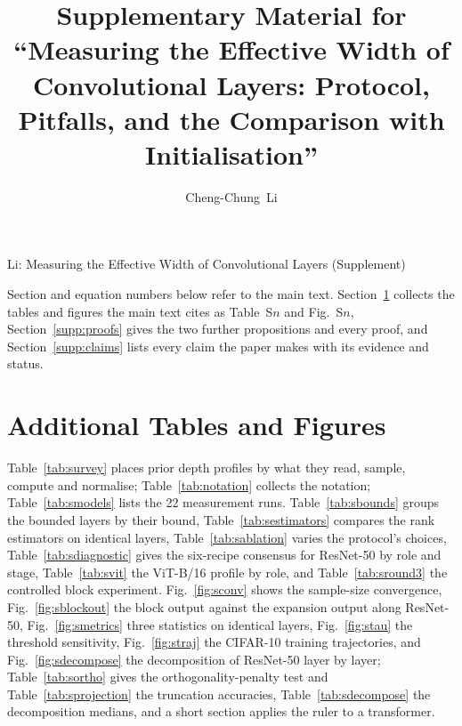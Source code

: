 \documentclass[10pt,journal,compsoc]{IEEEtran}
\begin{document}
\title{Supplementary Material for ``Measuring the Effective Width of Convolutional Layers: Protocol, Pitfalls, and the Comparison with Initialisation''}

\author{Cheng-Chung~Li%
%
}

%
{Li: Measuring the Effective Width of Convolutional Layers (Supplement)}

\maketitle

Section and equation numbers below refer to the main text. Section~\ref{supp:floats} collects the tables and figures the main text cites as Table~S$n$ and Fig.~S$n$, Section~\ref{supp:proofs} gives the two further propositions and every proof, and Section~\ref{supp:claims} lists every claim the paper makes with its evidence and status.

\section{Additional Tables and Figures}
\label{supp:floats}

Table~\ref{tab:survey} places prior depth profiles by what they read, sample, compute and normalise; Table~\ref{tab:notation} collects the notation; Table~\ref{tab:smodels} lists the 22 measurement runs. Table~\ref{tab:sbounds} groups the bounded layers by their bound, Table~\ref{tab:sestimators} compares the rank estimators on identical layers, Table~\ref{tab:sablation} varies the protocol's choices, Table~\ref{tab:sdiagnostic} gives the six-recipe consensus for ResNet-50 by role and stage, Table~\ref{tab:svit} the ViT-B/16 profile by role, and Table~\ref{tab:sround3} the controlled block experiment. Fig.~\ref{fig:sconv} shows the sample-size convergence, Fig.~\ref{fig:sblockout} the block output against the expansion output along ResNet-50, Fig.~\ref{fig:smetrics} three statistics on identical layers, Fig.~\ref{fig:stau} the threshold sensitivity, Fig.~\ref{fig:straj} the CIFAR-10 training trajectories, and Fig.~\ref{fig:sdecompose} the decomposition of ResNet-50 layer by layer; Table~\ref{tab:sortho} gives the orthogonality-penalty test and Table~\ref{tab:sprojection} the truncation accuracies, Table~\ref{tab:sdecompose} the decomposition medians, and a short section applies the ruler to a transformer.
\end{document}
